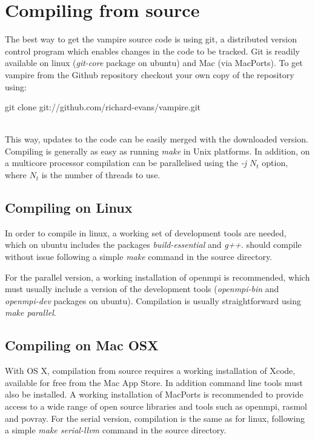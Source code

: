 \section*{Compiling from source}
The best way to get the vampire source code is using git, a distributed version control program which enables changes in the code to be tracked. Git is readily available on linux (\textit{git-core} package on ubuntu) and Mac (via MacPorts). To get vampire from the Github repository checkout your own copy of the repository using:\\

\begin{minipage}[c]{\textwidth}
\centering
git clone git://github.com/richard-evans/vampire.git
\end{minipage}\\

This way, updates to the code can be easily merged with the downloaded version. Compiling is generally as easy as running \textit{make} in Unix platforms. In addition, on a multicore processor compilation can be parallelised using the \textit{-j $N_t$} option, where $N_t$ is the number of threads to use.

\subsection*{Compiling on Linux}
In order to compile in linux, a working set of development tools are needed, which on ubuntu includes the packages \textit{build-essential} and \textit{g++}. 
\vampire should compile without issue following a simple \textit{make} command in the source directory.

For the parallel version, a working installation of openmpi is recommended, which must usually include a version of the development tools (\textit{openmpi-bin} and \textit{openmpi-dev} packages on ubuntu). Compilation is usually straightforward using \textit{make parallel}.

\subsection*{Compiling on Mac OSX}
 With OS X, compilation from source requires a working installation of Xcode, available for free from the Mac App Store. In addition command line tools must also be installed. A working installation of MacPorts is recommended to provide access to a wide range of open source libraries and tools such as openmpi, rasmol and povray. For the serial version, compilation is the same as for linux, following a simple \textit{make serial-llvm} command in the source directory.

